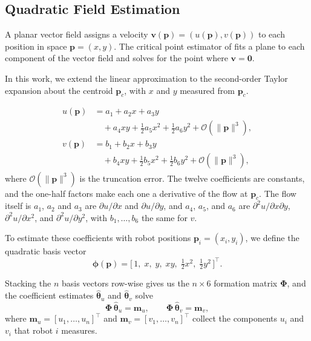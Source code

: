 \documentclass[lettersize,journal]{IEEEtran}
\begin{document}
\subsection{Quadratic Field Estimation}

A planar vector field assigns a velocity $\mathbf{v}(\mathbf{p}) =
(u(\mathbf{p}), v(\mathbf{p}))$ to each position in space $\mathbf{p} = (x, y)$.
The critical point estimator of \cite{10} fits a plane to each
component of the vector field and solves for the point where $\mathbf{v} = \mathbf{0}$. 

In this work, we extend the linear approximation to the second-order Taylor expansion about the
centroid $\mathbf{p}_c$, with $x$ and $y$ measured from $\mathbf{p}_c$.

\begin{align}
    u(\mathbf{p}) &= a_1 + a_2 x + a_3 y
        \nonumber \\
        &\quad + a_4 xy + \tfrac{1}{2} a_5 x^2 + \tfrac{1}{2} a_6 y^2
        + \mathcal{O}(\|\mathbf{p}\|^3),
        \label{eq:quad_model_u} \\
    v(\mathbf{p}) &= b_1 + b_2 x + b_3 y
        \nonumber \\
        &\quad + b_4 xy + \tfrac{1}{2} b_5 x^2 + \tfrac{1}{2} b_6 y^2
        + \mathcal{O}(\|\mathbf{p}\|^3),
        \label{eq:quad_model_v}
\end{align}
where $\mathcal{O}(\|\mathbf{p}\|^3)$ is the truncation error.
The twelve coefficients are constants, and the one-half factors make each
one a derivative of the flow at $\mathbf{p}_c$. The flow itself is $a_1$,
$a_2$ and $a_3$ are $\partial u/\partial x$ and $\partial u/\partial y$,
and $a_4$, $a_5$, and $a_6$ are $\partial^2 u/\partial x\partial y$,
$\partial^2 u/\partial x^2$, and $\partial^2 u/\partial y^2$, with
$b_1, \ldots, b_6$ the same for $v$.

To estimate these coefficients with robot positions $\mathbf{p}_i = (x_i,
y_i)$, we define the quadratic basis vector
\begin{equation}
    \boldsymbol{\phi}(\mathbf{p}) =
    \bigl[\,1, \; x, \; y, \; xy, \;
    \tfrac{1}{2}x^2, \; \tfrac{1}{2}y^2\,\bigr]^\top.
\end{equation}



Stacking the $n$ basis vectors row-wise gives us the $n \times 6$ formation matrix $\boldsymbol{\Phi}$, and the coefficient estimates $\hat{\boldsymbol{\theta}}_u$ and $\hat{\boldsymbol{\theta}}_v$ solve
\begin{equation}
\boldsymbol{\Phi}\,\hat{\boldsymbol{\theta}}_u = \mathbf{m}_u, \qquad
\boldsymbol{\Phi}\,\hat{\boldsymbol{\theta}}_v = \mathbf{m}_v,
\label{eq:solve}
\end{equation}
where $\mathbf{m}_u = [u_1, \ldots, u_n]^\top$ and
$\mathbf{m}_v = [v_1, \ldots, v_n]^\top$ collect the components $u_i$
and $v_i$ that robot $i$ measures.
\end{document}
